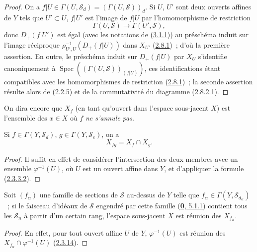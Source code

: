 \begin{proof}
On a $f|U\in\Gamma(U,\mathcal{S}_d)=(\Gamma(U,\mathcal{S}))_d$. Si $U$,
$U'$ sont deux ouverts affines de $Y$ tels que $U'\subset U$, $f|U'$ est
l'image de $f|U$ par l'homomorphisme de restriction
\[
  \Gamma(U,\mathcal{S})\longrightarrow\Gamma(U',\mathcal{S}),
\]
donc $D_+(f|U')$ est égal (avec les notations de
(\hyperref[II.3.1.1-fr]{3.1.1})) au préschéma induit sur l'image réciproque
$\rho_{U',U}^{-1}(D_+(f|U))$ dans $X_{U'}$
(\hyperref[II.2.8.1-fr]{2.8.1})~; d'où la première assertion. En outre, le
préschéma induit sur $D_+(f|U)$ par $X_U$ s'identifie canoniquement à
$\operatorname{Spec}((\Gamma(U,\mathcal{S}))_{(f|U)})$, ces identifications
étant compatibles avec les homomorphismes de restriction
(\hyperref[II.2.8.1-fr]{2.8.1})~; la seconde assertion résulte alors de
(\hyperref[II.2.2.5-fr]{2.2.5}) et de la commutativité du diagramme
(\hyperref[II.2.8.2.1-fr]{2.8.2.1}).
\end{proof}

On dira encore que $X_f$ (en tant qu'ouvert dans l'espace sous-jacent $X$)
est l'ensemble des $x\in X$ où $f$ \emph{ne s'annule pas}.

\begin{corollary}[3.1.5]
\label{II.3.1.5-fr}
Si $f\in\Gamma(Y,\mathcal{S}_d)$, $g\in\Gamma(Y,\mathcal{S}_e)$, on a
\[
\label{II.3.1.5.1-fr}
  X_{fg}=X_f\cap X_g.
\tag{3.1.5.1}
\]
\end{corollary}

\begin{proof}
Il suffit en effet de considérer l'intersection des deux membres avec un
ensemble $\varphi^{-1}(U)$, où $U$ est un ouvert affine dans $Y$, et
d'appliquer la formule (\hyperref[II.2.3.3.2-fr]{2.3.3.2}).
\end{proof}

\begin{corollary}[3.1.6]
\label{II.3.1.6-fr}
Soit $(f_\alpha)$ une famille de sections de $\mathcal{S}$ au-dessus de $Y$
telle que $f_\alpha\in\Gamma(Y,\mathcal{S}_{d_\alpha})$~; si le faisceau
d'idéaux de $\mathcal{S}$ engendré par cette famille
\textup{(\hyperref[0.5.1.1-fr]{\textbf{0}, 5.1.1})} contient tous les $\mathcal{S}_n$ à partir
d'un certain rang, l'espace sous-jacent $X$ est réunion des $X_{f_\alpha}$.
\end{corollary}

\begin{proof}
En effet, pour tout ouvert affine $U$ de $Y$, $\varphi^{-1}(U)$ est réunion
des $X_{f_\alpha}\cap\varphi^{-1}(U)$
(\hyperref[II.2.3.14-fr]{2.3.14}).
\end{proof}

